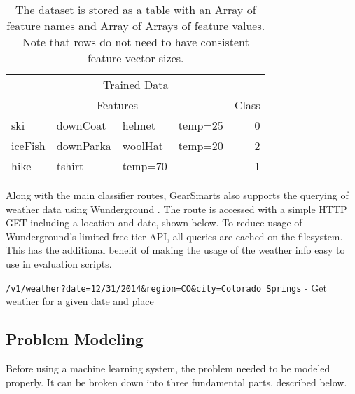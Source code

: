 \begin{table}
    \begin{tabular}{llllr}
        \hline
        \multicolumn{5}{c}{Trained Data} \\
        \multicolumn{4}{c}{Features} & Class \\
        \hline
        ski     & downCoat  & helmet      & temp=25  & 0 \\
        iceFish & downParka  & woolHat      & temp=20  & 2 \\
        hike    & tshirt & temp=70  & & 1 \\
        \hline
    \end{tabular}
    \caption{The dataset is stored as a table with an Array of feature names and Array of Arrays of feature values. Note that rows
    do not need to have consistent feature vector sizes.}
    \label{table:datarow}
\end{table}

Along with the main classifier routes, GearSmarts also supports the querying of weather data using Wunderground \cite{wunderground}.
The route is accessed with a simple HTTP GET including a location and date, shown below. To reduce usage of Wunderground's limited
free tier API, all queries are cached on the filesystem. This has the additional benefit of making the usage of the weather info
easy to use in evaluation scripts.

\begin{description}
    \item{\texttt{/v1/weather?date=12/31/2014&region=CO&city=Colorado Springs}} - Get weather for a given date and place
\end{description}


\subsection{Problem Modeling}
Before using a machine learning system, the problem needed to be modeled properly. It can be broken down into three
fundamental parts, described below.


